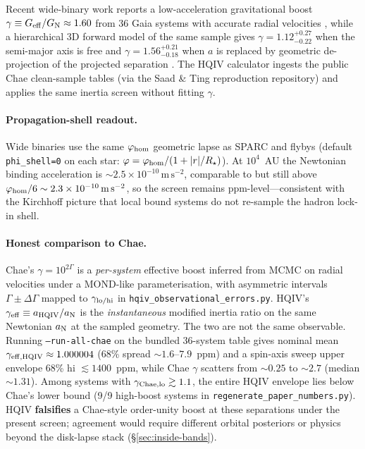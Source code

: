 \documentclass[11pt]{amsart}
\begin{document}
Recent wide-binary work reports a low-acceleration gravitational boost
$\gamma\equiv G_{\rm eff}/G_{\rm N}\approx1.60$ from 36 Gaia systems with accurate
radial velocities \cite{chae2026wide}, while a hierarchical 3D forward model of the
same sample gives $\gamma=1.12^{+0.27}_{-0.22}$ when the semi-major axis is free and
$\gamma=1.56^{+0.21}_{-0.18}$ when $a$ is replaced by geometric de-projection of the
projected separation \cite{saad2026wide}. The HQIV calculator ingests the public Chae
clean-sample tables (via the Saad \& Ting reproduction repository) and applies the
same inertia screen without fitting $\gamma$.

\paragraph{Propagation-shell readout.}
Wide binaries use the same $\varphi_{\rm hom}$ geometric lapse as SPARC and flybys
(default \texttt{phi\_shell=0} on each star: $\varphi=\varphi_{\rm hom}/(1+|r|/R_\star)$).
At $10^4$~AU the Newtonian binding acceleration is
$\sim2.5\times10^{-10}\,\mathrm{m\,s^{-2}}$, comparable to but still above
$\varphi_{\rm hom}/6\sim2.3\times10^{-10}\,\mathrm{m\,s^{-2}}$, so the screen remains
ppm-level---consistent with the Kirchhoff picture that local bound systems do not
re-sample the hadron lock-in shell.

\paragraph{Honest comparison to Chae.}
Chae's $\gamma=10^{2\Gamma}$ is a \emph{per-system} effective boost inferred from
MCMC on radial velocities under a MOND-like parameterisation, with asymmetric intervals
$\Gamma\pm\Delta\Gamma$ mapped to $\gamma_{\rm lo/hi}$ in
\texttt{hqiv\_observational\_errors.py}. HQIV's
$\gamma_{\rm eff}\equiv a_{\rm HQIV}/a_{\rm N}$ is the \emph{instantaneous} modified
inertia ratio on the same Newtonian $a_{\rm N}$ at the sampled geometry. The two are
not the same observable. Running \texttt{--run-all-chae} on the bundled 36-system table
gives nominal mean $\gamma_{\rm eff,HQIV}\approx1.000004$ (68\% spread $\sim1.6$--$7.9$~ppm)
and a spin-axis sweep upper envelope 68\% hi $\lesssim1400$~ppm, while Chae $\gamma$
scatters from $\sim0.25$ to $\sim2.7$ (median $\sim1.31$). Among systems with
$\gamma_{\rm Chae,lo}\gtrsim1.1$, the entire HQIV envelope lies below Chae's lower bound
(9/9 high-boost systems in \texttt{regenerate\_paper\_numbers.py}). HQIV \textbf{falsifies} a Chae-style order-unity boost at these
separations under the present screen; agreement would require different orbital posteriors
\cite{saad2026wide} or physics beyond the disk-lapse stack (\S\ref{sec:inside-bands}).
\end{document}
